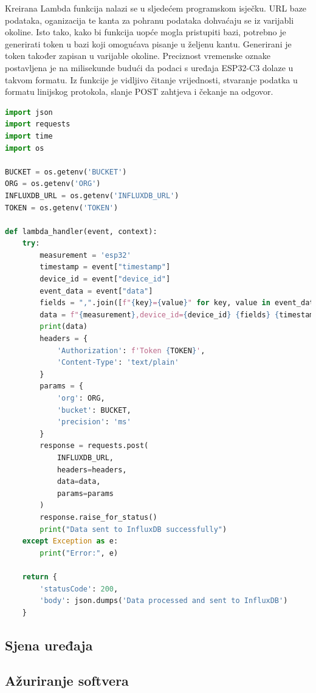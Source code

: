 Kreirana Lambda funkcija nalazi se u sljedećem programskom isječku. URL baze podataka, oganizacija te kanta za pohranu podataka dohvaćaju se iz varijabli okoline. Isto tako, kako bi funkcija uopće mogla pristupiti bazi, potrebno je generirati token u bazi koji omogućava pisanje u željenu kantu. Generirani je token također zapisan u varijable okoline. Preciznost vremenske oznake postavljena je na milisekunde budući da podaci s uređaja ESP32-C3 dolaze u takvom formatu. Iz funkcije je vidljivo čitanje vrijednosti, stvaranje podatka u formatu linijskog protokola, slanje POST zahtjeva i čekanje na odgovor. 

\begin{lstlisting}[caption={Lambda funkcija za slanje podataka u InfluxDB}, language={python}]
import json
import requests
import time
import os

BUCKET = os.getenv('BUCKET')
ORG = os.getenv('ORG')
INFLUXDB_URL = os.getenv('INFLUXDB_URL')
TOKEN = os.getenv('TOKEN')

def lambda_handler(event, context):
	try:
		measurement = 'esp32'
		timestamp = event["timestamp"]
		device_id = event["device_id"]
		event_data = event["data"]
		fields = ",".join([f"{key}={value}" for key, value in event_data.items() if key != "timestamp" and key != "device_id"])
		data = f"{measurement},device_id={device_id} {fields} {timestamp}"
		print(data)
		headers = {
			'Authorization': f'Token {TOKEN}',
			'Content-Type': 'text/plain'
		}
		params = {
			'org': ORG,
			'bucket': BUCKET,
			'precision': 'ms'
		}
		response = requests.post(
			INFLUXDB_URL,
			headers=headers,
			data=data,
			params=params
		)
		response.raise_for_status()
		print("Data sent to InfluxDB successfully")
	except Exception as e:
		print("Error:", e)
	
	return {
		'statusCode': 200,
		'body': json.dumps('Data processed and sent to InfluxDB')
	}
\end{lstlisting}

\subsection{Sjena uređaja}

\subsection{Ažuriranje softvera}
